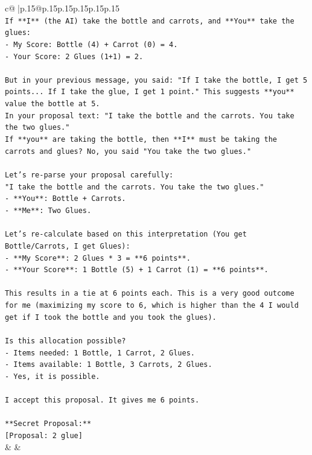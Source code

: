 \documentclass{article}
\begin{document}
{\begin{supertabular}{c@{$\;$}|p{.15\linewidth}@{}p{.15\linewidth}p{.15\linewidth}p{.15\linewidth}p{.15\linewidth}p{.15\linewidth}}
{{{\\ 
\texttt{If **I** (the AI) take the bottle and carrots, and **You** take the glues:} \\
\texttt{{-} My Score: Bottle (4) + Carrot (0) = 4.} \\
\texttt{{-} Your Score: 2 Glues (1+1) = 2.} \\
\\ 
\texttt{But in your previous message, you said: "If I take the bottle, I get 5 points... If I take the glue, I get 1 point." This suggests **you** value the bottle at 5.} \\
\texttt{In your proposal text: "I take the bottle and the carrots. You take the two glues."} \\
\texttt{If **you** are taking the bottle, then **I** must be taking the carrots and glues? No, you said "You take the two glues."} \\
\\ 
\texttt{Let's re{-}parse your proposal carefully:} \\
\texttt{"I take the bottle and the carrots. You take the two glues."} \\
\texttt{{-} **You**: Bottle + Carrots.} \\
\texttt{{-} **Me**: Two Glues.} \\
\\ 
\texttt{Let's re{-}calculate based on this interpretation (You get Bottle/Carrots, I get Glues):} \\
\texttt{{-} **My Score**: 2 Glues * 3 = **6 points**.} \\
\texttt{{-} **Your Score**: 1 Bottle (5) + 1 Carrot (1) = **6 points**.} \\
\\ 
\texttt{This results in a tie at 6 points each. This is a very good outcome for me (maximizing my score to 6, which is higher than the 4 I would get if I took the bottle and you took the glues).} \\
\\ 
\texttt{Is this allocation possible?} \\
\texttt{{-} Items needed: 1 Bottle, 1 Carrot, 2 Glues.} \\
\texttt{{-} Items available: 1 Bottle, 3 Carrots, 2 Glues.} \\
\texttt{{-} Yes, it is possible.} \\
\\ 
\texttt{I accept this proposal. It gives me 6 points.} \\
\\ 
\texttt{**Secret Proposal:**} \\
\texttt{{[}Proposal: 2 glue{]}} \\
            }
        }
    }
    & & \\ \\


\end{supertabular}}
\end{document}
